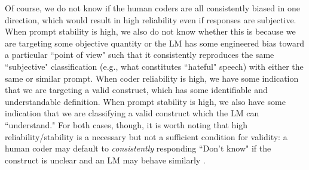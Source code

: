 Of course, we do not know if the human coders are all consistently biased in one direction, which would result in high reliability even if responses are subjective. When prompt stability is high, we also do not know whether this is because we are targeting some objective quantity or the LM has some engineered bias toward a particular ``point of view" such that it consistently reproduces the same ``subjective" classification (e.g., what constitutes ``hateful" speech) with either the same or similar prompt. When coder reliability is high, we have some indication that we are targeting a valid construct, which has some identifiable and understandable definition. When prompt stability is high, we also have some indication that we are classifying a valid construct which the LM can ``understand." For both cases, though, it is worth noting that high reliability/stability is a necessary but not a sufficient condition for validity: a human coder may default to \textit{consistently} responding ``Don't know" if the construct is unclear and an LM may behave similarly .


